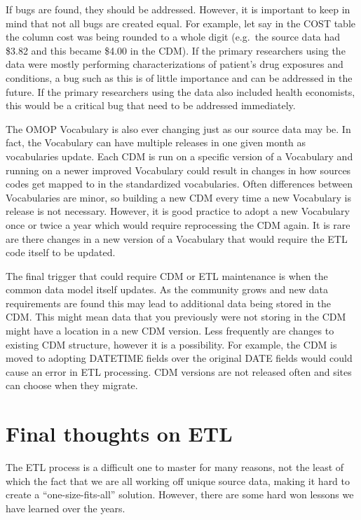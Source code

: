 \documentclass[11pt]{book}
\theoremstyle{definition}
\theoremstyle{definition}
\theoremstyle{definition}
\theoremstyle{remark}
\begin{document}
If bugs are found, they should be addressed. However, it is important to keep in mind that not all bugs are created equal. For example, let say in the COST table the column cost was being rounded to a whole digit (e.g.~the source data had \$3.82 and this became \$4.00 in the CDM). If the primary researchers using the data were mostly performing characterizations of patient's drug exposures and conditions, a bug such as this is of little importance and can be addressed in the future. If the primary researchers using the data also included health economists, this would be a critical bug that need to be addressed immediately.

The OMOP Vocabulary is also ever changing just as our source data may be. In fact, the Vocabulary can have multiple releases in one given month as vocabularies update. Each CDM is run on a specific version of a Vocabulary and running on a newer improved Vocabulary could result in changes in how sources codes get mapped to in the standardized vocabularies. Often differences between Vocabularies are minor, so building a new CDM every time a new Vocabulary is release is not necessary. However, it is good practice to adopt a new Vocabulary once or twice a year which would require reprocessing the CDM again. It is rare are there changes in a new version of a Vocabulary that would require the ETL code itself to be updated.

The final trigger that could require CDM or ETL maintenance is when the common data model itself updates. As the community grows and new data requirements are found this may lead to additional data being stored in the CDM. This might mean data that you previously were not storing in the CDM might have a location in a new CDM version. Less frequently are changes to existing CDM structure, however it is a possibility. For example, the CDM is moved to adopting DATETIME fields over the original DATE fields would could cause an error in ETL processing. CDM versions are not released often and sites can choose when they migrate.

\hypertarget{final-thoughts-on-etl}{%
\section{Final thoughts on ETL}\label{final-thoughts-on-etl}}

The ETL process is a difficult one to master for many reasons, not the least of which the fact that we are all working off unique source data, making it hard to create a ``one-size-fits-all'' solution. However, there are some hard won lessons we have learned over the years.
\end{document}

